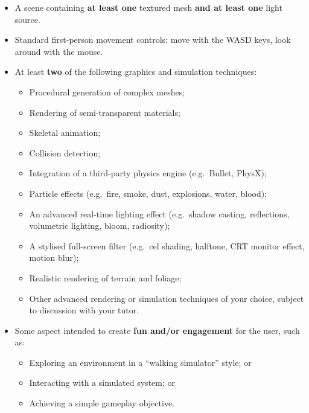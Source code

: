 \documentclass{../fal_assignment}
\begin{document}
\begin{itemize}
	\item A scene containing \textbf{at least one} textured mesh \textbf{and at least one} light source.
	\item Standard first-person movement controls:
		move with the WASD keys, look around with the mouse.
	\item At least \textbf{two} of the following graphics and simulation techniques:
		\begin{itemize}
			\item Procedural generation of complex meshes;
			\item Rendering of semi-transparent materials;
			\item Skeletal animation;
			\item Collision detection;
			\item Integration of a third-party physics engine (e.g.\ Bullet, PhysX);
			\item Particle effects (e.g.\ fire, smoke, dust, explosions, water, blood);
			\item An advanced real-time lighting effect (e.g.\ shadow casting, reflections, volumetric lighting, bloom, radiosity);
			\item A stylised full-screen filter (e.g.\ cel shading, halftone, CRT monitor effect, motion blur);
			\item Realistic rendering of terrain and foliage;
			\item Other advanced rendering or simulation techniques of your choice,
				subject to discussion with your tutor.
		\end{itemize}
	\item Some aspect intended to create \textbf{fun and/or engagement} for the user,
		such as:
		\begin{itemize}
			\item Exploring an environment in a ``walking simulator'' style; or
			\item Interacting with a simulated system; or
			\item Achieving a simple gameplay objective.
		\end{itemize}
\end{itemize}
\end{document}

